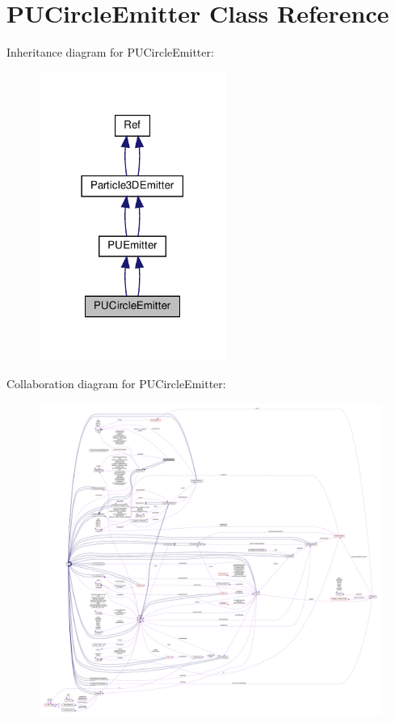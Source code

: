 \hypertarget{classPUCircleEmitter}{}\section{P\+U\+Circle\+Emitter Class Reference}
\label{classPUCircleEmitter}


Inheritance diagram for P\+U\+Circle\+Emitter\+:
\nopagebreak
\begin{figure}[H]
\begin{center}
\leavevmode
\includegraphics[width=174pt]{classPUCircleEmitter__inherit__graph}
\end{center}
\end{figure}


Collaboration diagram for P\+U\+Circle\+Emitter\+:
\nopagebreak
\begin{figure}[H]
\begin{center}
\leavevmode
\includegraphics[width=350pt]{classPUCircleEmitter__coll__graph}
\end{center}
\end{figure}
